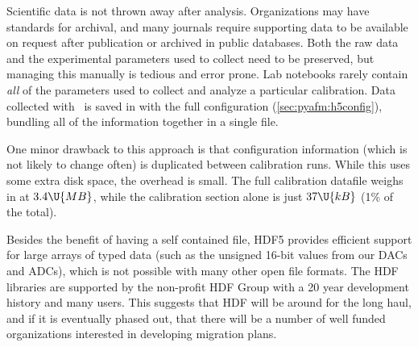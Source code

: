 Scientific data is not thrown away after analysis.  Organizations may
have standards for archival, and many journals require supporting data
to be available on request after publication or archived in public
databases\citep{pnas-data-archival,nature-data-archival}.  Both the
raw data and the experimental parameters used to collect need to be
preserved, but managing this manually is tedious and error prone.  Lab
notebooks rarely contain \emph{all} of the parameters used to collect
and analyze a particular calibration.  Data collected with
\calibcant\ is saved in  with the full configuration
(\cref{sec:pyafm:h5config}), bundling all of the information together
in a single file.

One minor drawback to this approach is that configuration information
(which is not likely to change often) is duplicated between
calibration runs.  While this uses some extra disk space, the overhead
is small.  The full calibration datafile weighs in at $3.4\U{MB}$,
while the calibration section alone is just $37\U{kB}$ (1\% of the
total).

Besides the benefit of having a self contained file, HDF5 provides
efficient support for large arrays of typed data (such as the unsigned
16-bit values from our DACs and ADCs), which is not possible with many
other open file formats.  The HDF libraries are supported by the
non-profit HDF Group with a 20 year development
history\citep{hdf-group} and many users\citep{hdf-users}.  This
suggests that HDF will be around for the long haul, and if it is
eventually phased out, that there will be a number of well funded
organizations interested in developing migration plans.
